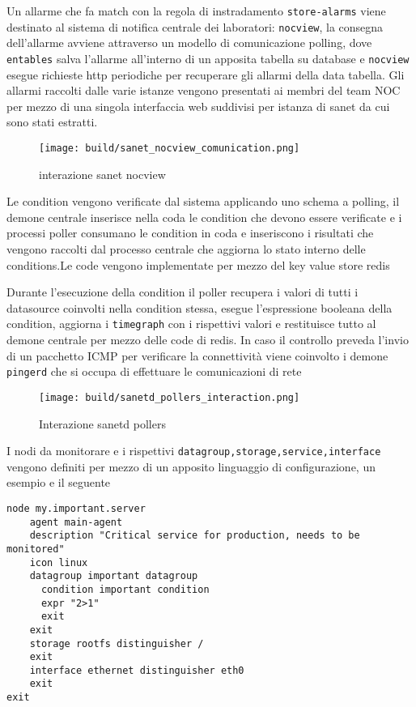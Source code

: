 \documentclass[12pt,a4paper,twoside,openright]{book}
\begin{document}
Un allarme che fa match con la regola di instradamento \verb|store-alarms| viene destinato al sistema di notifica centrale dei laboratori: \verb|nocview|, la consegna dell'allarme avviene attraverso un modello di comunicazione polling, dove \verb|entables| salva l'allarme all'interno di un apposita tabella su database e \verb|nocview| esegue richieste http periodiche per recuperare gli allarmi della data tabella.
Gli allarmi raccolti dalle varie istanze vengono presentati ai membri del team NOC per mezzo di una singola interfaccia web suddivisi per istanza di sanet da cui sono stati estratti.

\begin{figure}[H]
    \centering
    \texttt{[image: build/sanet\_nocview\_comunication.png]}
    \caption{interazione sanet nocview}
    \label{fig:enter-label}
\end{figure}

Le condition vengono verificate dal sistema applicando uno schema a polling, il demone centrale inserisce nella coda le condition che devono essere verificate e i processi poller consumano le condition in coda e inseriscono i risultati che vengono raccolti dal processo centrale che aggiorna lo stato interno delle conditions.Le code vengono implementate per mezzo del key value store redis

Durante l'esecuzione della condition il poller recupera i valori di tutti i datasource coinvolti nella condition stessa, esegue l'espressione booleana della condition, aggiorna i \verb|timegraph| con i rispettivi valori e restituisce tutto al demone centrale per mezzo delle code di redis. In caso il controllo preveda l'invio di un pacchetto ICMP per verificare la connettività viene coinvolto i demone \verb|pingerd| che si occupa di effettuare le comunicazioni di rete

\begin{figure}[H]
    \centering
    \texttt{[image: build/sanetd\_pollers\_interaction.png]}
    \caption{Interazione sanetd pollers}
    \label{fig:enter-label}
\end{figure}

I nodi da monitorare e i rispettivi \verb|datagroup,storage,service,interface| vengono definiti per mezzo di un apposito linguaggio di configurazione, un esempio e il seguente

\begin{lstlisting}
node my.important.server
    agent main-agent
    description "Critical service for production, needs to be monitored"
    icon linux
    datagroup important datagroup
      condition important condition
      expr "2>1"
      exit
    exit
    storage rootfs distinguisher /
    exit
    interface ethernet distinguisher eth0
    exit
exit
\end{lstlisting}
\end{document}

